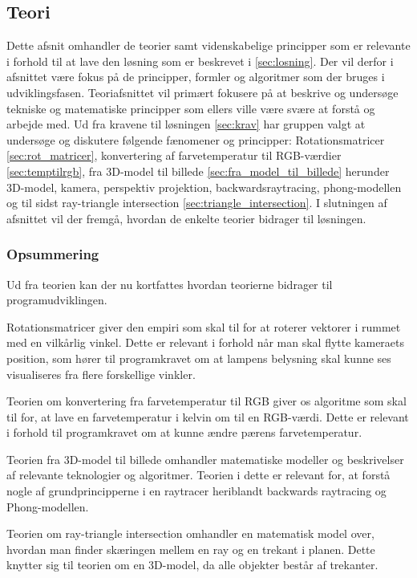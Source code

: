 \subsection{Teori}
\label{sec:teori}

Dette afsnit omhandler de teorier samt videnskabelige principper som er relevante i forhold til at lave den løsning som er beskrevet i \ref{sec:losning}. Der vil derfor i afsnittet være fokus på de principper, formler og algoritmer som der bruges i udviklingsfasen. Teoriafsnittet vil primært fokusere på at beskrive og undersøge tekniske og matematiske principper som ellers ville være svære at forstå og arbejde med. Ud fra kravene til løsningen \ref{sec:krav} har gruppen valgt at undersøge og diskutere følgende fænomener og principper: Rotationsmatricer \ref{sec:rot_matricer}, konvertering af farvetemperatur til RGB-værdier \ref{sec:temptilrgb}, fra 3D-model til billede \ref{sec:fra_model_til_billede} herunder 3D-model, kamera, perspektiv projektion, backwardsraytracing, phong-modellen og til sidst ray-triangle intersection \ref{sec:triangle_intersection}. I slutningen af afsnittet vil der fremgå, hvordan de enkelte teorier bidrager til løsningen.









\subsubsection*{Opsummering}

Ud fra teorien kan der nu kortfattes hvordan teorierne bidrager til programudviklingen. 

Rotationsmatricer giver den empiri som skal til for at roterer vektorer i rummet med en vilkårlig vinkel. Dette er relevant i forhold når man skal flytte kameraets position, som hører til programkravet om at lampens belysning skal kunne ses visualiseres fra flere forskellige vinkler.

Teorien om konvertering fra farvetemperatur til RGB giver os algoritme som skal til for, at lave en farvetemperatur i kelvin om til en RGB-værdi. Dette er relevant i forhold til programkravet om at kunne ændre pærens farvetemperatur. 

Teorien fra 3D-model til billede omhandler matematiske modeller og beskrivelser af relevante teknologier og algoritmer. Teorien i dette er relevant for, at forstå nogle af grundprincipperne i en raytracer heriblandt backwards raytracing og Phong-modellen.

Teorien om ray-triangle intersection omhandler en matematisk model over, hvordan man finder skæringen mellem en ray og en trekant i planen. Dette knytter sig til teorien om en 3D-model, da alle objekter består af trekanter. 